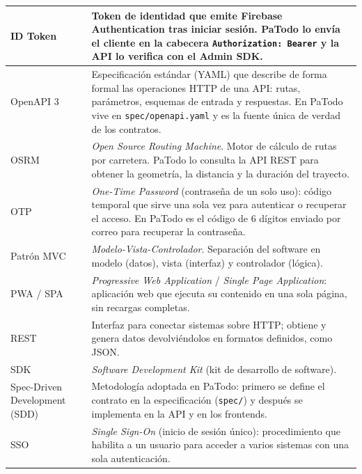 \documentclass[doc,12pt,a4paper]{apa7}
\begin{document}
\begin{longtable}{|P{3.3cm}|L{11.2cm}|}
ID Token & Token de identidad que emite Firebase Authentication tras iniciar sesión. PaTodo lo envía el cliente en la cabecera \texttt{Authorization: Bearer} y la API lo verifica con el Admin SDK. \\ \hline

OpenAPI 3 & Especificación estándar (YAML) que describe de forma formal las operaciones HTTP de una API: rutas, parámetros, esquemas de entrada y respuestas. En PaTodo vive en \texttt{spec/openapi.yaml} y es la fuente única de verdad de los contratos. \\ \hline

OSRM & \textit{Open Source Routing Machine}. Motor de cálculo de rutas por carretera. PaTodo lo consulta la API REST para obtener la geometría, la distancia y la duración del trayecto. \\ \hline

OTP & \textit{One-Time Password} (contraseña de un solo uso): código temporal que sirve una sola vez para autenticar o recuperar el acceso. En PaTodo es el código de 6 dígitos enviado por correo para recuperar la contraseña. \\ \hline

Patrón MVC & \textit{Modelo-Vista-Controlador}. Separación del software en modelo (datos), vista (interfaz) y controlador (lógica). \\ \hline

PWA / SPA & \textit{Progressive Web Application} / \textit{Single Page Application}: aplicación web que ejecuta su contenido en una sola página, sin recargas completas. \\ \hline

REST & Interfaz para conectar sistemas sobre HTTP; obtiene y genera datos devolviéndolos en formatos definidos, como JSON. \\ \hline

SDK & \textit{Software Development Kit} (kit de desarrollo de software). \\ \hline

Spec-Driven Development (SDD) & Metodología adoptada en PaTodo: primero se define el contrato en la especificación (\texttt{spec/}) y después se implementa en la API y en los frontends. \\ \hline

SSO & \textit{Single Sign-On} (inicio de sesión único): procedimiento que habilita a un usuario para acceder a varios sistemas con una sola autenticación. \\ \hline


\end{longtable}
\end{document}
